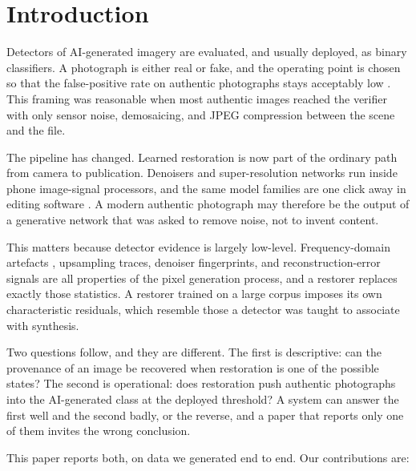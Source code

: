 \documentclass[runningheads]{llncs}
\begin{document}
\section{Introduction}

Detectors of AI-generated imagery are evaluated, and usually deployed, as binary
classifiers. A photograph is either real or fake, and the operating point is chosen
so that the false-positive rate on authentic photographs stays acceptably low
\cite{wang2020cnnspot,ojha2023univfd}. This framing was reasonable when most
authentic images reached the verifier with only sensor noise, demosaicing, and JPEG
compression between the scene and the file.

The pipeline has changed. Learned restoration is now part of the ordinary path from
camera to publication. Denoisers and super-resolution networks run inside phone
image-signal processors, and the same model families are one click away in editing
software \cite{wang2021realesrgan,zamir2022restormer,liang2021swinir}. A modern
authentic photograph may therefore be the output of a generative network that was
asked to remove noise, not to invent content.

This matters because detector evidence is largely low-level. Frequency-domain
artefacts \cite{frank2020frequency}, upsampling traces, denoiser fingerprints, and
reconstruction-error signals \cite{wang2023dire} are all properties of the pixel
generation process, and a restorer replaces exactly those statistics. A restorer
trained on a large corpus imposes its own characteristic residuals, which resemble
those a detector was taught to associate with synthesis.

Two questions follow, and they are different. The first is descriptive: can the
provenance of an image be recovered when restoration is one of the possible states?
The second is operational: does restoration push authentic photographs into the
AI-generated class at the deployed threshold? A system can answer the first well and
the second badly, or the reverse, and a paper that reports only one of them invites
the wrong conclusion.

This paper reports both, on data we generated end to end. Our contributions are:
\end{document}
